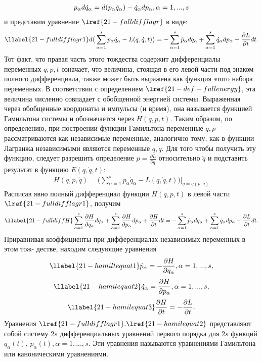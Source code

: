 	\begin{gather*}
	p_\alpha d\dot{q}_\alpha = d(p_\alpha \dot{q}_\alpha) - \dot{q}_\alpha dp_\alpha,\space \alpha = 1,...,s
	\end{gather*}
	и представим уравнение $\lref{21-fulldifflagr}$ в виде:
	\begin{gather}
	\llabel{21-fulldifflagr1}
	d\big(\sum_{\alpha=1}^{s}p_\alpha \dot{q}_\alpha - L(q, \dot{q}, t)\big) = -\sum_{\alpha=1}^{s}\dot{p}_\alpha dq_\alpha + \sum_{\alpha=1}^{s}\dot{q}_\alpha dp_\alpha - \frac{\partial{L}}{\partial{t}}dt.
	\end{gather}
	Тот факт, что правая часть этого тождества содержит дифференциалы переменных $q, p, t$ означает, что величина, стоящая в его левой части под знаком полного дифференциала, также может быть выражена как функция этого набора переменных. В соответствии с определением $\lref{21-def-fullenergy}$, эта величина численно совпадает с обобщенной энергией системы. Выраженная через обобщенные координаты и импульсы (и время), она называется функцией Гамильтона системы и обозначается через $H(q, p, t)$. Таким образом, по определению, при построении функции Гамильтона переменные $q, p$ рассматриваются как независимые переменные, аналогично тому, как в функции Лагранжа независимыми являются переменные $q, \dot{q}$. Для того чтобы получить эту функцию, следует разрешить определение $p=\frac{\partial{L}}{\partial{\dot{q}}}$ относительно $\dot{q}$ и подставить результат в функцию $E(q,\dot{q},t)$:
	\begin{gather*}
	H(q,p,\dot{q}) = \big(\sum_{\alpha=1}^{s}p_\alpha\dot{q}_\alpha - L(q,\dot{q},t)\big)\big|_{\dot{q}=\dot{q}(p,q)}
	\end{gather*}
	Расписав явно полный дифференциал функции $H(q, p, t)$ в левой части $\lref{21-fulldifflagr1}$, получим
	\begin{gather}
	\llabel{21-fulldiffH}
	\sum_{\alpha=1}^{s}\frac{\partial{H}}{\partial{q_\alpha}}dq_\alpha + \sum_{\alpha=1}^{s}\frac{\partial{H}}{\partial{p_\alpha}}dp_\alpha + \frac{\partial{H}}{\partial{t}}dt = -\sum_{\alpha=1}^{s}\dot{p}_\alpha dq_\alpha + \sum_{\alpha=1}^{s}\dot{q}_\alpha dp_\alpha - \frac{\partial{L}}{\partial{t}}dt.
	\end{gather}
	Приравнивая коэффициенты при дифференциалах независимых переменных в этом тож-
	дестве, находим следующие уравнения
	\begin{gather}
	\llabel{21-hamiltequat1}
	\dot{p}_\alpha = -\frac{\partial{H}}{\partial{q_\alpha}}, \space \alpha = 1,...,s,
	\end{gather}
	\begin{gather}
	\llabel{21-hamilequat2}
	\dot{q}_\alpha = \frac{\partial{H}}{\partial{p_\alpha}}, \space \alpha = 1,...,s,
	\end{gather}
	\begin{gather}
	\llabel{21-hamilequat3}
	\frac{\partial{H}}{\partial{t}} = -\frac{\partial{L}}{\partial{t}}.
	\end{gather}
	Уравнения $\lref{21-fulldifflagr1}. \lref{21-hamilequat2}$ представляют собой систему $2s$ дифференциальных уравнений первого порядка для $2s$ функций $q_α(t)$, $p_α(t), α = 1, ..., s$. Эти уравнения называются уравнениями
	Гамильтона или каноническими уравнениями.\\
	
